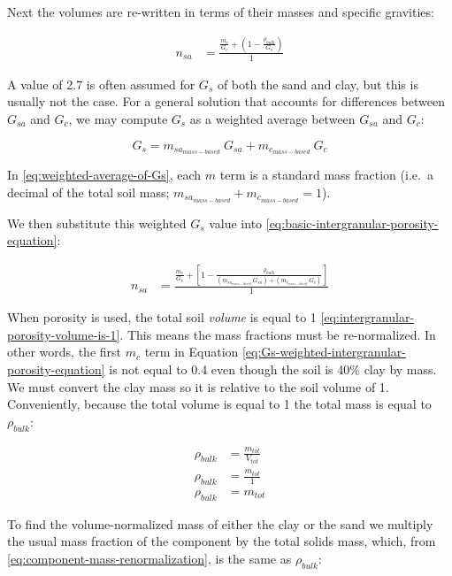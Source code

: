 \documentclass[
  letterpaper,
  openany]{book}
\begin{document}
Next the volumes are re-written in terms of their masses and specific gravities:

\begin{align}n_{sa} &= \frac{\frac{m_c}{G_c} + \left( 1 - \frac{\rho_{bulk}}{G_s} \right) }{1}
\end{align}

A value of 2.7 is often assumed for \(G_s\) of both the sand and clay, but this is usually not the case. For a general solution that accounts for differences between \(G_{sa}\) and \(G_c\), we may compute \(G_s\) as a weighted average between \(G_{sa}\) and \(G_c\):

\begin{equation}
G_s = m_{sa_{mass-based}}~G_{sa} + m_{c_{mass-based}}~G_c
\label{eq:weighted-average-of-Gs}
\end{equation}

In \eqref{eq:weighted-average-of-Gs}, each \(m\) term is a standard mass fraction (i.e.~a decimal of the total soil mass; \(m_{sa_{mass-based}} + m_{c_{mass-based}} = 1\)).

We then substitute this weighted \(G_s\) value into \eqref{eq:basic-intergranular-porosity-equation}:

\begin{align}
n_{sa}&=\frac{\frac{m_c}{G_c}+\left[ 1 - \frac{\rho_{bulk}}{\left(  m_{sa_{mass-based}}~G_{sa}\right)  + \left( m_{c_{mass-based}}~G_c \right) } \right]}{1}
\label{eq:Gs-weighted-intergranular-porosity-equation}
\end{align}

When porosity is used, the total soil \emph{volume} is equal to 1 \eqref{eq:intergranular-porosity-volume-is-1}.
This means the mass fractions must be re-normalized.
In other words, the first \(m_c\) term in Equation \eqref{eq:Gs-weighted-intergranular-porosity-equation} is not equal to 0.4 even though the soil is 40\% clay by mass.
We must convert the clay mass so it is relative to the soil volume of 1.
Conveniently, because the total volume is equal to 1 the total mass is equal to \(\rho_{bulk}\):

\begin{align}
\rho_{bulk} &= \frac{m_{tot}}{V_{tot}} \nonumber \\ 
\rho_{bulk} &= \frac{m_{tot}}{1} \nonumber \\
\rho_{bulk} &= m_{tot}
\label{eq:component-mass-renormalization}
\end{align}

To find the volume-normalized mass of either the clay or the sand we multiply the usual mass fraction of the component by the total solids mass, which, from \eqref{eq:component-mass-renormalization}, is the same as \(\rho_{bulk}\):
\end{document}
